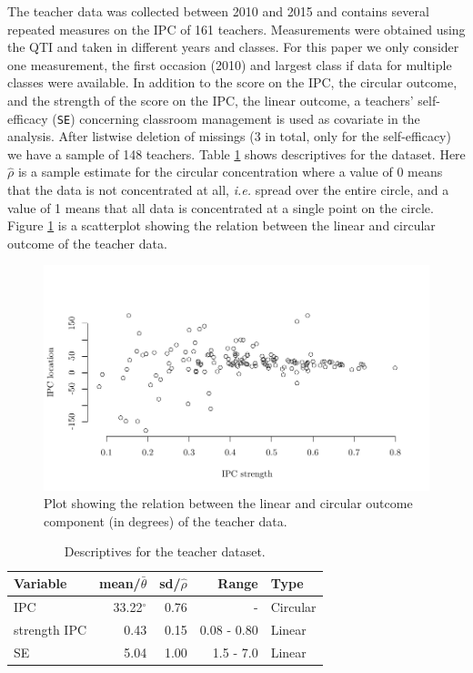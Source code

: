 \documentclass[12pt,]{article}
\begin{document}
The teacher data was collected between 2010 and 2015 and contains
several repeated measures on the IPC of 161 teachers. Measurements were
obtained using the QTI and taken in different years and classes. For
this paper we only consider one measurement, the first occasion (2010)
and largest class if data for multiple classes were available. In
addition to the score on the IPC, the circular outcome, and the strength
of the score on the IPC, the linear outcome, a teachers' self-efficacy
(\verb|SE|) concerning classroom management is used as covariate in the
analysis. After listwise deletion of missings (\(3\) in total, only for
the self-efficacy) we have a sample of 148 teachers. Table
\ref{Tableteacherdescriptives} shows descriptives for the dataset. Here
\(\hat{\rho}\) is a sample estimate for the circular concentration where
a value of 0 means that the data is not concentrated at all, \emph{i.e.}
spread over the entire circle, and a value of 1 means that all data is
concentrated at a single point on the circle. Figure \ref{dataplot} is a
scatterplot showing the relation between the linear and circular outcome
of the teacher data.

\begin{figure}
\centering
\includegraphics[width = \textwidth]{Plots/dataplot.pdf}
\caption{Plot showing the relation between the linear and circular outcome component (in degrees) of the teacher data.}
\label{dataplot}
\end{figure}

\begin{table}[h]
\centering
\caption{Descriptives for the teacher dataset.} 
\begin{tabular}{lrrrl}
  \noalign{\smallskip}\hline\noalign{\smallskip}
Variable & mean/$\bar{\theta}$ & sd/$\hat{\rho}$ & Range & Type \\ \hline\noalign{\smallskip}
IPC &33.22$^\circ$& 0.76 & - & Circular\\
strength IPC & 0.43 & 0.15 & 0.08 - 0.80 & Linear\\
SE & 5.04 & 1.00 & 1.5 - 7.0 & Linear\\
   \hline
\end{tabular}
\label{Tableteacherdescriptives}
\end{table}
\end{document}
